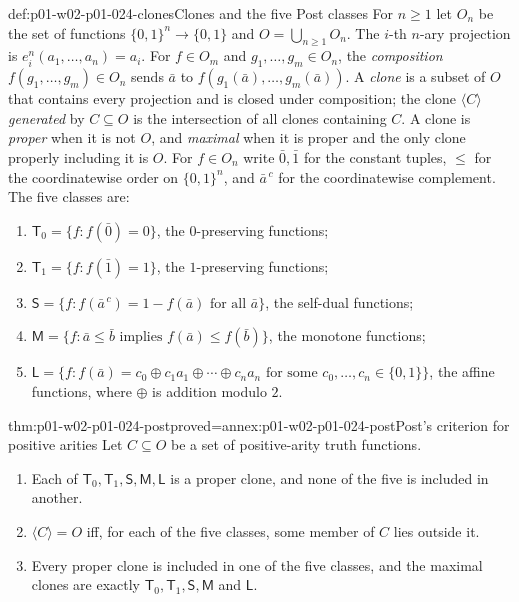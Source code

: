 \begin{hbdefinition}{def:p01-w02-p01-024-clones}{Clones and the five Post classes}
For \(n\geq1\) let \(O_n\) be the set of functions
\(\{0,1\}^n\to\{0,1\}\) and \(O=\bigcup_{n\geq1}O_n\).  The \(i\)-th
\(n\)-ary projection is \(e^n_i(a_1,\ldots,a_n)=a_i\).  For
\(f\in O_m\) and \(g_1,\ldots,g_m\in O_n\), the \emph{composition}
\(f(g_1,\ldots,g_m)\in O_n\) sends \(\bar a\) to
\(f(g_1(\bar a),\ldots,g_m(\bar a))\).  A \emph{clone} is a subset of
\(O\) that contains every projection and is closed under composition; the
clone \(\langle C\rangle\) \emph{generated} by \(C\subseteq O\) is the
intersection of all clones containing \(C\).  A clone is \emph{proper} when
it is not \(O\), and \emph{maximal} when it is proper and the only clone
properly including it is \(O\).  For \(f\in O_n\) write
\(\bar0,\bar1\) for the constant tuples, \(\leq\) for the coordinatewise
order on \(\{0,1\}^n\), and \(\bar a^{\,c}\) for the coordinatewise
complement.  The five classes are:
\begin{enumerate}
\item \(\mathsf T_0=\{f:f(\bar0)=0\}\), the \(0\)-preserving functions;
\item \(\mathsf T_1=\{f:f(\bar1)=1\}\), the \(1\)-preserving functions;
\item \(\mathsf S=\{f:f(\bar a^{\,c})=1-f(\bar a)\text{ for all }\bar a\}\),
  the self-dual functions;
\item \(\mathsf M=\{f:\bar a\leq\bar b\text{ implies }f(\bar a)\leq
  f(\bar b)\}\), the monotone functions;
\item \(\mathsf L=\{f:f(\bar a)=c_0\oplus c_1a_1\oplus\cdots\oplus c_na_n
  \text{ for some }c_0,\ldots,c_n\in\{0,1\}\}\), the affine functions,
  where \(\oplus\) is addition modulo \(2\).
\end{enumerate}
\end{hbdefinition}

\begin{hbtheorem}{thm:p01-w02-p01-024-post}{proved=annex:p01-w02-p01-024-post}{Post's criterion for positive arities}
Let \(C\subseteq O\) be a set of positive-arity truth functions.
\begin{enumerate}
\item Each of \(\mathsf T_0,\mathsf T_1,\mathsf S,\mathsf M,\mathsf L\) is a
  proper clone, and none of the five is included in another.
\item \(\langle C\rangle=O\) iff, for each of the five classes, some member
  of \(C\) lies outside it.
\item Every proper clone is included in one of the five classes, and the
  maximal clones are exactly \(\mathsf T_0,\mathsf T_1,\mathsf S,\mathsf M\)
  and \(\mathsf L\).
\end{enumerate}
\end{hbtheorem}

